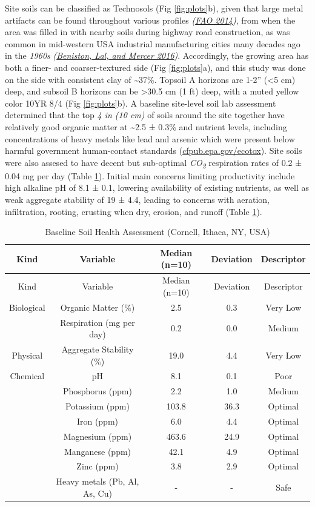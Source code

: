 \documentclass[
]{article}
\begin{document}
Site soils can be classified as Technosols (Fig \ref{fig:plots}b), given that large metal artifacts can be found throughout various profiles \emph{(\protect\hyperlink{ref-fao14}{FAO 2014})}, from when the area was filled in with nearby soils during highway road construction, as was common in mid-western USA industrial manufacturing cities many decades ago in the \emph{1960s} \emph{(\protect\hyperlink{ref-beniston16}{Beniston, Lal, and Mercer 2016})}.
Accordingly, the growing area has both a finer- and coarser-textured side (Fig \ref{fig:plots}a),
and this study was done on the side with consistent clay of \textasciitilde37\%.
Topsoil A horizons are 1-2'' (\textless5 cm) deep, and subsoil B horizons can be \textgreater30.5 cm (1 ft) deep, with a muted yellow color 10YR 8/4 (Fig \ref{fig:plots}b).
A baseline site-level soil lab assessment determined that the top \emph{4 in (10 cm)} of soils around the site together have relatively good organic matter at
\textasciitilde2.5 ±
0.3\%
and nutrient levels, including concentrations of heavy metals like lead and arsenic which were present below harmful government human-contact standards (\url{cfpub.epa.gov/ecotox}).
Site soils were also assesed to have decent but sub-optimal \emph{CO\textsubscript{2}} respiration rates of
0.2 ±
0.04 mg per day
(Table \ref{tab:chemKbl}).
Initial main concerns limiting productivity include high alkaline pH of
8.1 ±
0.1,
lowering availability of existing nutrients, as well as weak aggregate stability of
19 ±
4.4,
leading to concerns with aeration, infiltration, rooting, crusting when dry, erosion, and runoff (Table \ref{tab:chemKbl}).

\begin{longtable}[]{@{}ccccc@{}}
\caption{\label{tab:chemKbl}Baseline Soil Health Assessment (Cornell, Ithaca, NY, USA)}\tabularnewline
\toprule
Kind & Variable & Median (n=10) & Deviation & Descriptor \\
\midrule
\endfirsthead
\toprule
Kind & Variable & Median (n=10) & Deviation & Descriptor \\
\midrule
\endhead
Biological & Organic Matter (\%) & 2.5 & 0.3 & Very Low \\
& Respiration (mg per day) & 0.2 & 0.0 & Medium \\
Physical & Aggregate Stability (\%) & 19.0 & 4.4 & Very Low \\
Chemical & pH & 8.1 & 0.1 & Poor \\
& Phosphorus (ppm) & 2.2 & 1.0 & Medium \\
& Potassium (ppm) & 103.8 & 36.3 & Optimal \\
& Iron (ppm) & 6.0 & 4.4 & Optimal \\
& Magnesium (ppm) & 463.6 & 24.9 & Optimal \\
& Manganese (ppm) & 42.1 & 4.9 & Optimal \\
& Zinc (ppm) & 3.8 & 2.9 & Optimal \\
& Heavy metals (Pb, Al, As, Cu) & - & - & Safe \\
\bottomrule
\end{longtable}
\end{document}
